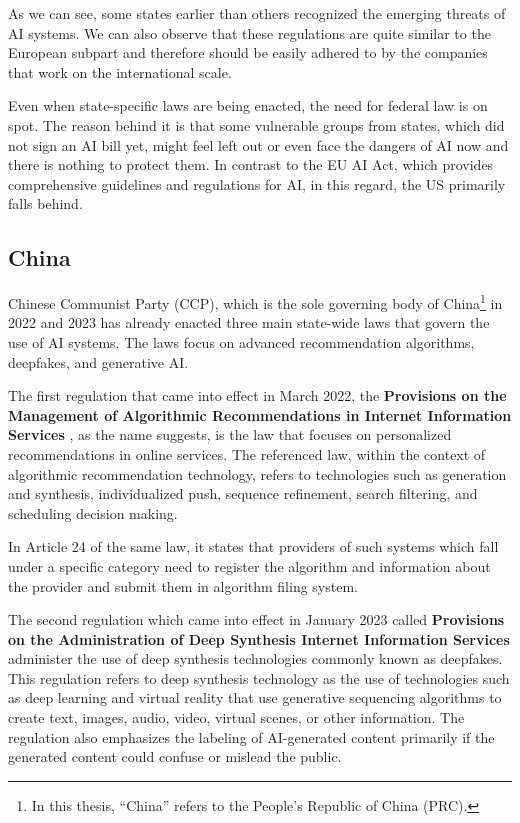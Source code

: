 As we can see, some states earlier than others recognized the emerging threats of AI systems. We can also observe that these regulations are quite similar to the European subpart and therefore should be easily adhered to by the companies that work on the international scale.

Even when state-specific laws are being enacted, the need for federal law is on spot. The reason behind it is that some vulnerable groups from states, which did not sign an AI bill yet, might feel left out or even face the dangers of AI now and there is nothing to protect them. In contrast to the EU AI Act, which provides comprehensive guidelines and regulations for AI, in this regard, the US primarily falls behind.

\subsection{China}
Chinese Communist Party (CCP), which is the sole governing body of China\footnote{In this thesis, ``China'' refers to the People's Republic of China (PRC).} in 2022 and 2023 has already enacted three main state-wide laws that govern the use of AI systems. The laws focus on advanced recommendation algorithms, deepfakes, and generative AI.

The first regulation that came into effect in March 2022, the \textbf{Provisions on the Management of Algorithmic Recommendations in Internet Information Services} \cite{ProvisionsAlgorithmicRecommendations2022, CACAlgorithmicRecommendations2022}, as the name suggests, is the law that focuses on personalized recommendations in online services. The referenced law, within the context of algorithmic recommendation technology, refers to technologies such as generation and synthesis, individualized push, sequence refinement, search filtering, and scheduling decision making.
    
In Article 24 of the same law, it states that providers of such systems which fall under a specific category need to register the algorithm and information about the provider and submit them in algorithm filing system.

The second regulation which came into effect in January 2023 called \textbf{Provisions on the Administration of Deep Synthesis Internet Information Services} \cite{ProvisionsDeepSynthesis2022, CACDeepSynthesisRegulations2023} administer the use of deep synthesis technologies commonly known as deepfakes. This regulation refers to deep synthesis technology as the use of technologies such as deep learning and virtual reality that use generative sequencing algorithms to create text, images, audio, video, virtual scenes, or other information. The regulation also emphasizes the labeling of AI-generated content primarily if the generated content could confuse or mislead the public.

